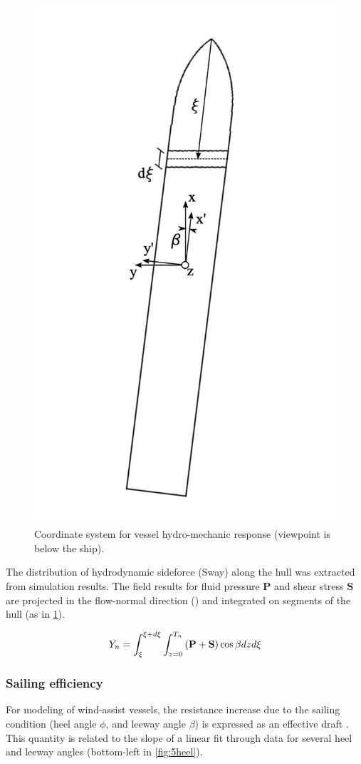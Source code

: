 \documentclass[twoside,twocolumn]{article}
\begin{document}
	\begin{figure}[!ht]
		\centering
		\includegraphics[width=.7\columnwidth]{images/cut_coordinates.png}  %
		\caption{Coordinate system for vessel hydro-mechanic response (viewpoint is below the ship).}
		\label{fig:cutcoord}
	\end{figure}
	
	The distribution of hydrodynamic sideforce (Sway) along the hull was extracted from simulation results. The field results for fluid pressure $\mathbf{P}$ and shear stress $\mathbf{S}$ are projected in the flow-normal direction (\nY) and integrated on segments of the hull (as in \cref{fig:cutcoord}).
	
	\begin{equation}
	Y_n=\int_{\xi}^{\xi+d\xi} \int_{z=0}^{T_n} \left(\mathbf{P}+\mathbf{S}\right)  \cos{\beta} \space dz \space d\xi
	\end{equation}
	
	\subsubsection{Sailing efficiency}
	For modeling of wind-assist vessels, the resistance increase due to the sailing condition (heel angle $\phi$, and leeway angle $\beta$) is expressed as an effective draft \Te. This quantity is related to the slope of a linear fit through data for several heel and leeway angles (bottom-left in \cref{fig:5heel}).
	
\end{document}

